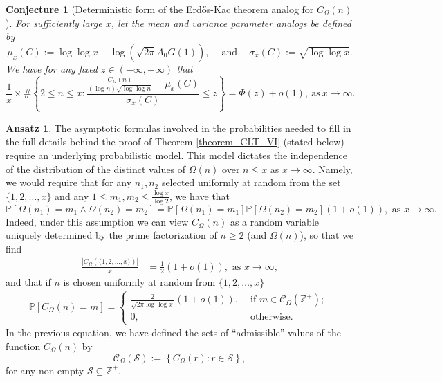 \documentclass[11pt,reqno,a4letter]{article}
\numberwithin{figure}{section}
\numberwithin{table}{section}
\theoremstyle{plain}
\newtheorem{conjecture}[theorem]{Conjecture}
\numberwithin{theorem}{section}
\theoremstyle{definition}
\newtheorem{ansatz}[theorem]{Ansatz}
\begin{document}
\begin{conjecture}[Deterministic form of the Erd\H{o}s-Kac theorem analog for $C_{\Omega}(n)$]
\label{conj_DetFormOfEKTypeThmForCOmegan_v1} 
For sufficiently large $x$, let the mean and variance parameter analogs be defined by 
\[
\mu_x(C) := \log\log x - 
     \log\left(\sqrt{2\pi}A_0 \widehat{G}(1)\right), 
     \quad \mathrm{\ and\ } \quad 
     \sigma_x(C) := \sqrt{\log\log x}. 
\]
We have for any fixed $z \in (-\infty, +\infty)$ that 
\[
\frac{1}{x} \times \#\left\{2 \leq n \leq x: 
     \frac{\frac{C_{\Omega}(n)}{(\log n)\sqrt{\log\log n}} - 
     \mu_x(C)}{\sigma_x(C)} \leq z\right\} = 
     \Phi\left(z\right) + o(1), 
     \mathrm{\ as\ } x \rightarrow \infty. 
\]
\end{conjecture} 

\begin{ansatz} 
\label{ansatz_KeyIndependenceAssumptions} 
The asymptotic formulas involved in the probabilities needed to fill in the full details 
behind the proof of 
Theorem \ref{theorem_CLT_VI} (stated below) 
require an underlying probabilistic model. This model dictates the independence of the 
distribution of the distinct values of $\Omega(n)$ over $n \leq x$ as $x \rightarrow \infty$. 
Namely, we would require that for any $n_1,n_2$ selected uniformly at random from the set 
$\{1,2,\ldots,x\}$ and any $1 \leq m_1,m_2 \leq \frac{\log x}{\log 2}$, we have that 
\[
\mathbb{P}\left[\Omega(n_1) = m_1 \wedge \Omega(n_2) = m_2\right] = 
     \mathbb{P}\left[\Omega(n_1) = m_1\right] \mathbb{P}\left[\Omega(n_2) = m_2\right] (1 + o(1)), 
     \text{ as } x \rightarrow \infty. 
\] 
Indeed, under this assumption we can view $C_{\Omega}(n)$ as a random variable uniquely determined 
by the prime factorization of $n \geq 2$ (and $\Omega(n)$), so that we find 
\begin{align*}
\frac{\left\lvert C_{\Omega}(\{1,2,\ldots,x\}) \right\rvert}{x} & = \frac{1}{2}(1 + o(1)), 
     \text{ as } x \rightarrow \infty, 
\end{align*} 
and that if $n$ is chosen uniformly at random from $\{1,2,\ldots,x\}$ 
\begin{align*}
\mathbb{P}\left[C_{\Omega}(n) = m\right] = \begin{cases} 
     \frac{2}{\sqrt{2\pi\log\log x}}(1 + o(1)), & \text{ if $m \in \mathcal{C}_{\Omega}(\mathbb{Z}^{+})$; } \\ 
     0, & \text{ otherwise. }
     \end{cases} 
\end{align*} 
In the previous equation, we have defined the sets of ``admissible'' 
values of the function $C_{\Omega}(n)$ by 
\[
\mathcal{C}_{\Omega}(\mathcal{S}) := \left\{C_{\Omega}(r): r \in \mathcal{S}\right\}, 
\]
for any non-empty $\mathcal{S} \subseteq \mathbb{Z}^{+}$. 
\end{ansatz} 
\end{document}
